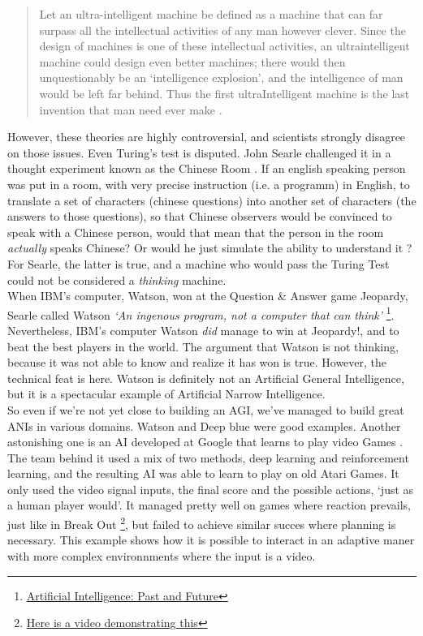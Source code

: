 \documentclass[12pt]{article}
\begin{document}
\smallskip

\begin{quotation}
   Let an ultra-intelligent machine be defined as a machine that can far surpass
   all the intellectual activities of any man however clever. Since the design
   of machines is one of these intellectual activities, an ultraintelligent
   machine could design even better machines; there would then unquestionably be
   an \lq intelligence explosion\rq , and the intelligence of man would be left
   far behind. Thus the first ultraIntelligent machine is the last invention
   that man need ever make \cite{Good}.
\end{quotation}

However, these theories are highly controversial, and scientists strongly
disagree on those issues. Even Turing's test is disputed. John Searle challenged
it in a thought experiment known as the Chinese Room \cite{ChineseRoom}. If an
english speaking person was put in a room, with very precise instruction (i.e. a
programm) in English, to translate a set of characters (chinese questions) into
another set of characters (the answers to those questions), so that Chinese
observers would be convinced to speak with a Chinese person, would that mean
that the person in the room {\em actually} speaks Chinese? Or would he just
simulate the ability to understand it ? For Searle, the latter is true, and a
machine who would pass the Turing Test could not be considered a {\em thinking}
machine. \\

When IBM's computer, Watson, won at the Question \& Answer game Jeopardy, Searle
called Watson \textit{\lq  An ingenous program, not a computer that can
think\rq} \footnote{
\href{http://cacm.acm.org/magazines/2012/1/144824-artificial-intelligence-past-and-future/fulltext}
{Artificial Intelligence: Past and Future}}. Nevertheless, IBM's computer Watson
{\em did} manage to win at Jeopardy!, and to beat the best players in the world.
The argument that Watson is not thinking, because it was not able to know and
realize it has won is true. However, the technical feat is here. Watson is
definitely not an Artificial General Intelligence, but it is a spectacular
example of Artificial Narrow Intelligence. \\

So even if we're not yet close to building an \gls{AGI}, we've managed to build
great \gls{ANI}s in various domains. Watson and Deep blue were good examples.
Another astonishing one is an AI developed at Google that learns to play video
Games \cite{Atari}. The team behind it used a mix of two methods, deep learning
and reinforcement learning, and the resulting AI was able to learn to play on
old Atari Games. It only used the video signal inputs, the final score and the
possible actions, \lq just as a human player would\rq. It managed pretty well on
games where reaction prevails, just like in Break Out
\footnote{\href{https://www.youtube.com/watch?v=cjpEIotvwFY} {Here is a video
demonstrating this}}, but failed to achieve similar succes where planning is
necessary. This example shows how it is possible to interact in an adaptive
maner with more complex environnments where the input is a video. \\
\end{document}
